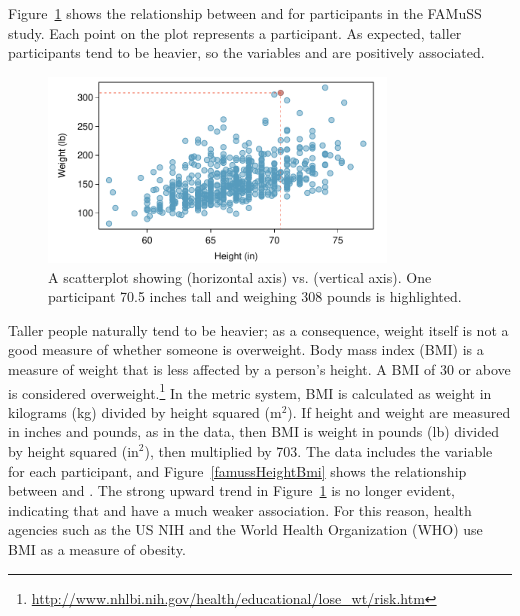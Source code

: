 \begin{doublespace}

Figure~\ref{famussHeightWeight} shows the relationship between  and  for participants in the FAMuSS study.  Each point on the plot represents a participant. As expected, taller participants tend to be heavier, so the variables  and  are positively associated.  

\begin{figure}[h]
\centering
\includegraphics[width=0.8\textwidth]
{ch_intro_to_data_oi_biostat/figures/famussHeightWeight/famussHeightWeight}
\caption{A scatterplot showing  (horizontal axis) vs.  (vertical axis). One participant 70.5 inches tall and weighing 308 pounds is highlighted.}
\label{famussHeightWeight}
\end{figure}

Taller people naturally tend to be heavier; as a consequence, weight itself is not a good measure of whether someone is overweight. Body mass index (BMI) is a measure of weight that is less affected by a person's height. A BMI of 30 or above is considered overweight.\footnote{\url{http://www.nhlbi.nih.gov/health/educational/lose_wt/risk.htm}} In the metric system, BMI is calculated as weight in kilograms (kg) divided by height squared ($\textrm {m}^{2}$). If height and weight are measured in inches and pounds, as in the  data, then BMI is weight in pounds (lb) divided by height squared ($\textrm {in}^{2}$), then multiplied by 703. The  data includes the variable  for each participant, and Figure~\ref{famussHeightBmi} shows the relationship between  and . The strong upward trend in Figure~\ref{famussHeightWeight} is no longer evident, indicating that  and  have a much weaker association. For this reason, health agencies such as the US NIH and the World Health Organization (WHO) use BMI as a measure of obesity. 


\end{doublespace}
